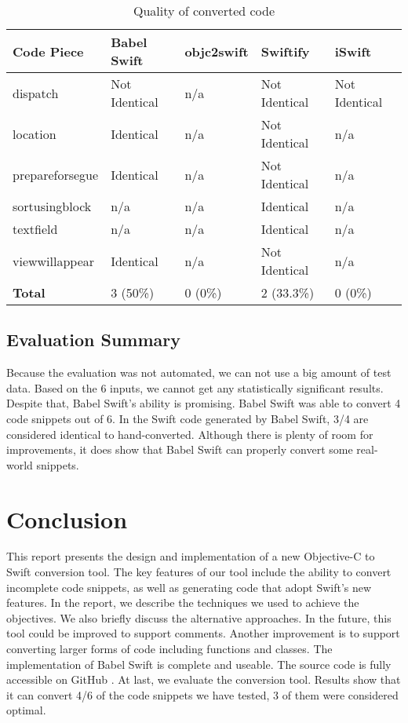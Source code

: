 \documentclass{sfuthesis}
\begin{document}
\begin{table}[H]
\begin{center}
\caption{Quality of converted code}
\label{table:quality}
\begin{tabular}{|l|l|l|l|l|}
\hline
\textbf{Code Piece} & Babel Swift & objc2swift & Swiftify & iSwift \\
\hline
dispatch        & Not Identical & n/a & Not Identical & Not Identical  \\
location        & Identical     & n/a & Not Identical & n/a            \\
prepareforsegue & Identical     & n/a & Not Identical & n/a            \\
sortusingblock  & n/a           & n/a & Identical     & n/a            \\
textfield       & n/a           & n/a & Identical     & n/a            \\
viewwillappear  & Identical     & n/a & Not Identical & n/a            \\
\hline
\textbf{Total}  & 3 (50\%) & 0 (0\%) & 2 (33.3\%) & 0 (0\%) \\
\hline
\end{tabular}
\end{center}
\end{table}

\section{Evaluation Summary}

Because the evaluation was not automated, we can not use a big amount of test data. Based on the 6 inputs, we cannot get any statistically significant results. Despite that, Babel Swift's ability is promising. Babel Swift was able to convert 4 code snippets out of 6. In the Swift code generated by Babel Swift, 3/4 are considered identical to hand-converted. Although there is plenty of room for improvements, it does show that Babel Swift can properly convert some real-world snippets.

\chapter{Conclusion}

This report presents the design and implementation of a new Objective-C to Swift conversion tool. The key features of our tool include the ability to convert incomplete code snippets, as well as generating code that adopt Swift's new features. In the report, we describe the techniques we used to achieve the objectives. We also briefly discuss the alternative approaches. In the future, this tool could be improved to support comments. Another improvement is to support converting larger forms of code including functions and classes.
The implementation of Babel Swift is complete and useable. The source code is fully accessible on GitHub \cite{babelswift}. At last, we evaluate the conversion tool. Results show that it can convert 4/6 of the code snippets we have tested, 3 of them were considered optimal.
\end{document}
